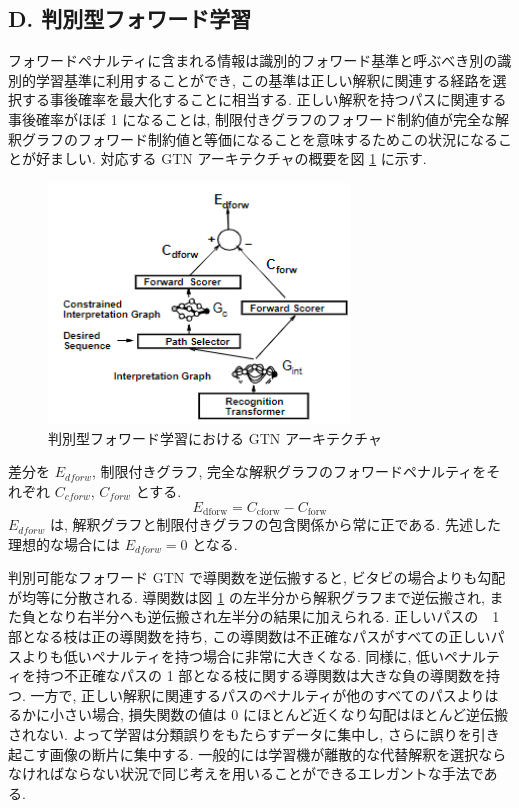\documentclass[twocolumn]{jarticle}     %
\begin{document}
\subsection*{D. 判別型フォワード学習}
フォワードペナルティに含まれる情報は識別的フォワード基準と呼ぶべき別の識別的学習基準に利用することができ, この基準は正しい解釈に関連する経路を選択する事後確率を最大化することに相当する. 正しい解釈を持つパスに関連する事後確率がほぼ 1 になることは, 制限付きグラフのフォワード制約値が完全な解釈グラフのフォワード制約値と等価になることを意味するためこの状況になることが好ましい.
対応する GTN アーキテクチャの概要を図 \ref{fig:21} に示す.
\begin{figure}[t]
  \centering
  \includegraphics[width=80mm]{assets/21.png}
  \caption{判別型フォワード学習における GTN アーキテクチャ}
  \label{fig:21}
\end{figure}
\par 
差分を $E_{dforw}$, 制限付きグラフ, 完全な解釈グラフのフォワードペナルティをそれぞれ $C_{cforw}$, $C_{forw}$ とする. 
\begin{equation}
  E_{\mathrm{dforw}} = C_{\mathrm{cforw}} - C_{\mathrm{forw}}
\end{equation}
$E_{dforw}$ は, 解釈グラフと制限付きグラフの包含関係から常に正である. 先述した理想的な場合には $E_{dforw} = 0$ となる.
\par
判別可能なフォワード GTN で導関数を逆伝搬すると, ビタビの場合よりも勾配が均等に分散される. 導関数は図 \ref{fig:21} の左半分から解釈グラフまで逆伝搬され, また負となり右半分へも逆伝搬され左半分の結果に加えられる. 正しいパスの　1 部となる枝は正の導関数を持ち, この導関数は不正確なパスがすべての正しいパスよりも低いペナルティを持つ場合に非常に大きくなる. 同様に, 低いペナルティを持つ不正確なパスの 1 部となる枝に関する導関数は大きな負の導関数を持つ. 一方で, 正しい解釈に関連するパスのペナルティが他のすべてのパスよりはるかに小さい場合, 損失関数の値は 0 にほとんど近くなり勾配はほとんど逆伝搬されない. よって学習は分類誤りをもたらすデータに集中し, さらに誤りを引き起こす画像の断片に集中する.
一般的には学習機が離散的な代替解釈を選択ならなければならない状況で同じ考えを用いることができるエレガントな手法である.
\end{document}
